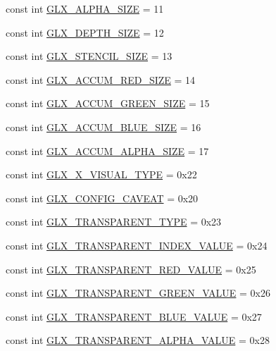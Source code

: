 \begin{DoxyCompactItemize}
\item 
const int \hyperlink{class_tao_1_1_platform_1_1_x11_1_1_glx_a60b9bf01361cb10bda18c677fa76b549}{GLX\_\-ALPHA\_\-SIZE} = 11
\item 
const int \hyperlink{class_tao_1_1_platform_1_1_x11_1_1_glx_a1810eb0afa5700e1e72b6bba71647ce6}{GLX\_\-DEPTH\_\-SIZE} = 12
\item 
const int \hyperlink{class_tao_1_1_platform_1_1_x11_1_1_glx_a64b2809c8935d9a5e6cd2fd81ae7273a}{GLX\_\-STENCIL\_\-SIZE} = 13
\item 
const int \hyperlink{class_tao_1_1_platform_1_1_x11_1_1_glx_af539ffb0cf59b67d9cd59de3c7badeae}{GLX\_\-ACCUM\_\-RED\_\-SIZE} = 14
\item 
const int \hyperlink{class_tao_1_1_platform_1_1_x11_1_1_glx_a18384deeeed23b36efad9c2e843377a3}{GLX\_\-ACCUM\_\-GREEN\_\-SIZE} = 15
\item 
const int \hyperlink{class_tao_1_1_platform_1_1_x11_1_1_glx_aa3fc9fd7ced74f8f222a0f39b1c5983e}{GLX\_\-ACCUM\_\-BLUE\_\-SIZE} = 16
\item 
const int \hyperlink{class_tao_1_1_platform_1_1_x11_1_1_glx_a11689c37d75bdeb3e22db03566409f7a}{GLX\_\-ACCUM\_\-ALPHA\_\-SIZE} = 17
\item 
const int \hyperlink{class_tao_1_1_platform_1_1_x11_1_1_glx_a0b25c68a108b2b1e3fd9a45a758e16f5}{GLX\_\-X\_\-VISUAL\_\-TYPE} = 0x22
\item 
const int \hyperlink{class_tao_1_1_platform_1_1_x11_1_1_glx_ac819c74afaae71b2a3ac8b12ca407974}{GLX\_\-CONFIG\_\-CAVEAT} = 0x20
\item 
const int \hyperlink{class_tao_1_1_platform_1_1_x11_1_1_glx_a63935700d84aed4d00078363b042ba6d}{GLX\_\-TRANSPARENT\_\-TYPE} = 0x23
\item 
const int \hyperlink{class_tao_1_1_platform_1_1_x11_1_1_glx_a4c9c3cb131d742722f69aaf0ad814943}{GLX\_\-TRANSPARENT\_\-INDEX\_\-VALUE} = 0x24
\item 
const int \hyperlink{class_tao_1_1_platform_1_1_x11_1_1_glx_a460b7d08f1fbc6d9bd8b925b1a709e3b}{GLX\_\-TRANSPARENT\_\-RED\_\-VALUE} = 0x25
\item 
const int \hyperlink{class_tao_1_1_platform_1_1_x11_1_1_glx_ade187253eb5b8a9f770c317f403eefc1}{GLX\_\-TRANSPARENT\_\-GREEN\_\-VALUE} = 0x26
\item 
const int \hyperlink{class_tao_1_1_platform_1_1_x11_1_1_glx_ac14d4b887ee1ff38d42538e2dd4f2a91}{GLX\_\-TRANSPARENT\_\-BLUE\_\-VALUE} = 0x27
\item 
const int \hyperlink{class_tao_1_1_platform_1_1_x11_1_1_glx_af7cef16f92ad62258a38868572d21ae3}{GLX\_\-TRANSPARENT\_\-ALPHA\_\-VALUE} = 0x28

\end{DoxyCompactItemize}
